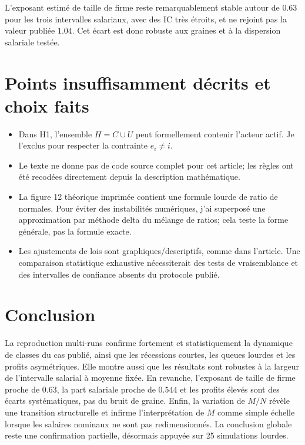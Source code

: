 \documentclass[11pt,a4paper]{article}
\begin{document}
L'exposant estimé de taille de firme reste remarquablement stable autour de $0.63$ pour les trois intervalles salariaux, avec des IC très étroits, et ne rejoint pas la valeur publiée $1.04$. Cet écart est donc robuste aux graines et à la dispersion salariale testée.

\section{Points insuffisamment décrits et choix faits}

\begin{itemize}
  \item Dans H1, l'ensemble $H=C\cup U$ peut formellement contenir l'acteur actif. Je l'exclus pour respecter la contrainte $e_i\ne i$.
  \item Le texte ne donne pas de code source complet pour cet article; les règles ont été recodées directement depuis la description mathématique.
  \item La figure 12 théorique imprimée contient une formule lourde de ratio de normales. Pour éviter des instabilités numériques, j'ai superposé une approximation par méthode delta du mélange de ratios; cela teste la forme générale, pas la formule exacte.
  \item Les ajustements de lois sont graphiques/descriptifs, comme dans l'article. Une comparaison statistique exhaustive nécessiterait des tests de vraisemblance et des intervalles de confiance absents du protocole publié.
\end{itemize}

\section{Conclusion}

La reproduction multi-runs confirme fortement et statistiquement la dynamique de classes du cas publié, ainsi que les récessions courtes, les queues lourdes et les profits asymétriques. Elle montre aussi que les résultats sont robustes à la largeur de l'intervalle salarial à moyenne fixée. En revanche, l'exposant de taille de firme proche de $0.63$, la part salariale proche de $0.544$ et les profits élevés sont des écarts systématiques, pas du bruit de graine. Enfin, la variation de $M/N$ révèle une transition structurelle et infirme l'interprétation de $M$ comme simple échelle lorsque les salaires nominaux ne sont pas redimensionnés. La conclusion globale reste une confirmation partielle, désormais appuyée sur 25 simulations lourdes.
\end{document}
